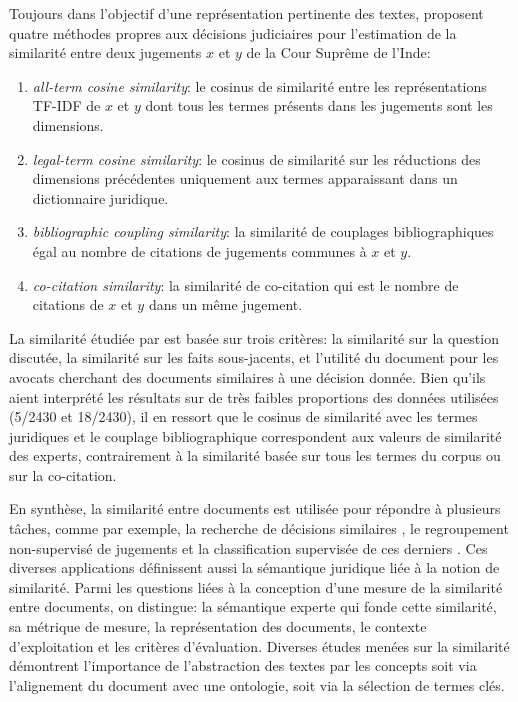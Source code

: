 Toujours dans l'objectif d'une représentation pertinente des textes, \citet{kumar2011judgmentsimilarity} proposent quatre méthodes propres aux décisions judiciaires pour l'estimation de la similarité entre deux jugements  $x$ et $y$ de la Cour Suprême de l'Inde:
\begin{enumerate}
\item \textit{all-term cosine similarity}: le cosinus de similarité entre les représentations TF-IDF de $x$ et $y$ dont tous les termes présents dans les jugements sont les dimensions.
\item \textit{legal-term cosine similarity}: le cosinus de similarité sur les réductions des dimensions précédentes uniquement aux termes apparaissant dans un dictionnaire juridique.
\item  \textit{bibliographic coupling similarity}: la similarité de couplages bibliographiques égal au nombre de citations de jugements communes à $x$ et $y$.
\item \textit{co-citation similarity}: la similarité de co-citation qui est le nombre de citations de $x$ et $y$ dans un même jugement. 
\end{enumerate}

 La similarité étudiée par \citet{kumar2011judgmentsimilarity} est basée sur trois critères: la similarité sur la question discutée, la similarité sur les faits sous-jacents, et l'utilité du document pour les avocats cherchant des documents similaires à une décision donnée. Bien qu'ils aient interprété les résultats sur de très faibles proportions des données utilisées (5/2430 et 18/2430), il en ressort que le cosinus de similarité avec les termes juridiques et le couplage bibliographique correspondent aux valeurs de similarité des experts, contrairement à la similarité basée sur tous les termes du corpus ou sur la co-citation. 

En synthèse, la similarité entre documents est utilisée pour répondre à plusieurs tâches, comme par exemple, la recherche de décisions similaires \citep{thenmozhi2017legalprecedretriev}, le regroupement non-supervisé de jugements \citep{raghuveer2012legalclusteringLDA} et la classification supervisée de ces derniers \citep{ma2018wmdchinesecase}. Ces diverses applications définissent aussi la sémantique juridique liée à la notion de similarité. Parmi les questions liées à la conception d'une mesure de la similarité entre documents, on distingue: la sémantique experte qui fonde cette similarité, sa métrique de mesure, la représentation des documents, le contexte d'exploitation et les critères d'évaluation. Diverses études menées sur la similarité démontrent l'importance de l'abstraction des textes par les concepts soit via l'alignement du document avec une ontologie, soit via la sélection de termes clés.

